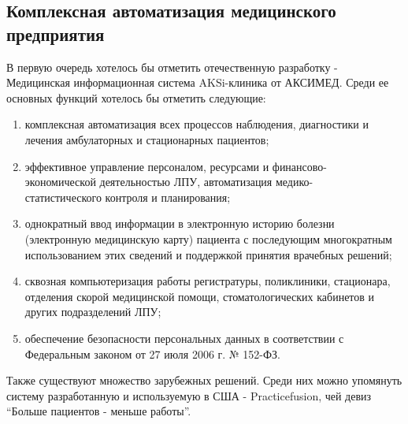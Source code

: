 \subsection{Комплексная автоматизация медицинского предприятия}
В первую очередь хотелось бы отметить отечественную разработку - Медицинская
информационная система AKSi-клиника от АКСИМЕД. Среди ее основных функций
хотелось бы отметить следующие:

\begin{enumerate}
  \item комплексная автоматизация всех процессов наблюдения, диагностики и
  лечения амбулаторных и стационарных пациентов;
  \item эффективное управление персоналом, ресурсами и
  финансово-\\экономической деятельностью ЛПУ, автоматизация
  медико-\\статистического контроля и планирования;
  \item однократный ввод информации в электронную историю болезни (электронную
  медицинскую карту) пациента с последующим многократным использованием этих сведений и поддержкой принятия врачебных решений;
  \item сквозная компьютеризация работы регистратуры, поликлиники, стационара,
  отделения скорой медицинской помощи, стоматологических кабинетов и других подразделений ЛПУ;
  \item обеспечение безопасности персональных данных в соответствии с
  Федеральным законом от 27 июля 2006 г. № 152-ФЗ.
\end{enumerate}

Также существуют множество зарубежных решений. Среди них можно упомянуть систему
разработанную и используемую в США - Practicefusion, чей девиз “Больше пациентов
- меньше работы”.





